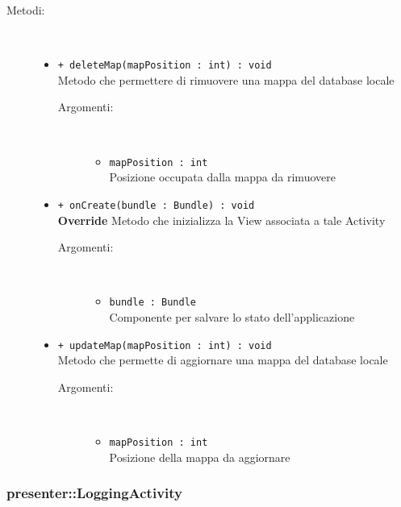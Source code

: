 \documentclass[../DefinizioneDiProdotto.tex]{subfiles}
\begin{document}
\begin{description}
\begin{itemize}
\end{itemize}
\item[Metodi:] \
\begin{itemize}
\item \texttt{+ deleteMap(mapPosition : int) : void}\\
Metodo che permettere di rimuovere una mappa del database locale
 \begin{description}
\item[Argomenti:] \
\begin{itemize}
\item \texttt{mapPosition : int}\\
Posizione occupata dalla mappa da rimuovere\end{itemize}
\end{description}
\item \texttt{+ onCreate(bundle : Bundle) : void}\\
\textbf{Override} Metodo che inizializza la View associata a tale Activity
 \begin{description}
\item[Argomenti:] \
\begin{itemize}
\item \texttt{bundle : Bundle}\\
Componente per salvare lo stato dell'applicazione\end{itemize}
\end{description}
\item \texttt{+ updateMap(mapPosition : int) : void}\\
Metodo che permette di aggiornare una mappa del database locale
 \begin{description}
\item[Argomenti:] \
\begin{itemize}
\item \texttt{mapPosition : int}\\
Posizione della mappa da aggiornare\end{itemize}
\end{description}
\end{itemize}
\end{description}

\subsubsection{presenter::LoggingActivity}
\end{document}
